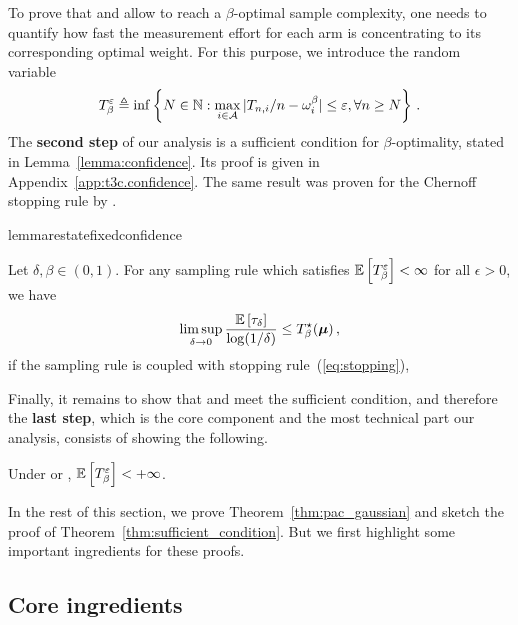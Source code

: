 To prove that \TTTS and \TCC allow to reach a $\beta$-optimal sample complexity, one needs to quantify how fast the measurement effort for each arm is concentrating to its corresponding optimal weight. For this purpose,  we introduce the random variable
\[
    T_{\beta}^\varepsilon \triangleq \inf \left\{ N\in{\mathbb N}: \max_{i\in\mathcal{A}} \vert T_{n,i}/n-\omega_i^\beta \vert \leq \varepsilon, \forall n \geq N \right\}\,.
\]
The \textbf{second step} of our analysis is a sufficient condition for $\beta$-optimality, stated in Lemma~\ref{lemma:confidence}. Its proof is given in Appendix~\ref{app:t3c.confidence}. The same result was proven for the Chernoff stopping rule by \cite{qin2017ttei}.

\begin{restatable}{lemma}{restatefixedconfidence}\label{lemma:confidence}
\begin{leftbar}[lemmabar]
    Let $\delta,\beta\in (0,1)$. For any sampling rule which satisfies $\mathbb{E}\left[T_{\beta}^\varepsilon\right] < \infty$ for all $\epsilon > 0$, we have
    \[
        \limsup_{\delta\rightarrow{0}} \frac{\mathbb{E}\left[\tau_{\delta}\right]}{\log(1/\delta)} \leq T_{\beta}^\star({\boldsymbol \mu})\,,
    \]
    if the sampling rule is coupled with stopping rule~(\ref{eq:stopping}), 
\end{leftbar}
\end{restatable}

Finally, it remains to show that \TTTS and \TCC meet the sufficient condition, and therefore the \textbf{last step}, which is the core component and the most technical part our analysis, consists of showing the following.

\begin{theorem}\label{thm:sufficient_condition}
\begin{leftbar}[theorembar]
    Under \TTTS or \TCC, $\mathbb{E}\left[T_{\beta}^\varepsilon\right] < +\infty$.
\end{leftbar}
\end{theorem}


In the rest of this section, we prove Theorem~\ref{thm:pac_gaussian} and sketch the proof of Theorem~\ref{thm:sufficient_condition}. But we first highlight some important ingredients for these proofs.

\subsection{Core ingredients}

